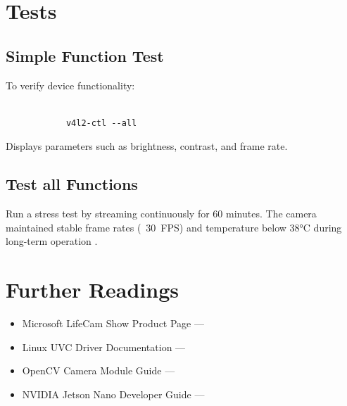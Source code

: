 \section{Tests}
\subsection{Simple Function Test}
To verify device functionality:


\begin{tcolorbox}[colback=white,colframe=black,coltext= ShellColor, sharp corners, boxrule=0.8pt]
	\begin{small}
		\begin{verbatim}
			
			v4l2-ctl --all	\end{verbatim}
	\end{small}
\end{tcolorbox}


Displays parameters such as brightness, contrast, and frame rate.

\subsection{Test all Functions}
Run a stress test by streaming continuously for 60 minutes.  
The camera maintained stable frame rates (~30~FPS) and temperature below 38°C during long-term operation \cite{techradar_lifecam_review}.

\section{Further Readings}
\begin{itemize}
	\item Microsoft LifeCam Show Product Page — \cite{microsoft_lifecam_datasheet}
	\item Linux UVC Driver Documentation — \cite{linux_uvc_driver}
	\item OpenCV Camera Module Guide — \cite{opencv_doc_2024}
	\item NVIDIA Jetson Nano Developer Guide — \cite{jetson_nano_doc}
\end{itemize}
